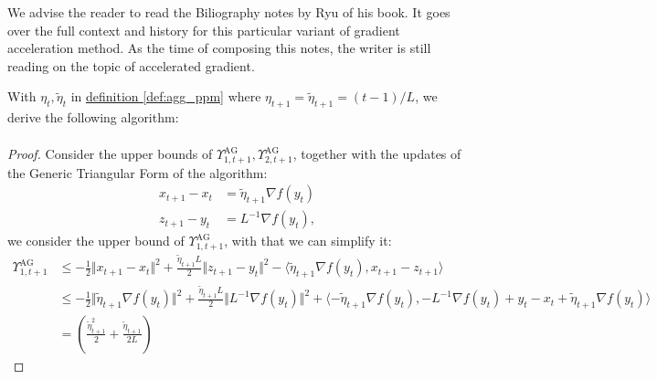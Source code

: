 \documentclass[12pt]{article}
\begin{document}
        We advise the reader to read the Biliography notes by Ryu \cite[chapter 12]{ryu_large-scale_2022} of his book. 
        It goes over the full context and history for this particular variant of gradient acceleration method. 
        As the time of composing this notes, the writer is still reading on the topic of accelerated gradient. 
        \begin{proposition}
            With $\eta_t, \tilde \eta_t$ in \hyperref[def:agg_ppm]{definition \ref*{def:agg_ppm}} where $\eta_{t + 1} = \tilde \eta_{t + 1} = (t - 1)/L$, we derive the following algorithm: 
            \begin{align*}
            \end{align*}

        \end{proposition}
        \begin{proof}
            Consider the upper bounds of $\Upsilon_{1, t + 1}^\text{AG}, \Upsilon_{2, t + 1}^\text{AG}$, together with the updates of the Generic Triangular Form of the algorithm:  
            \begin{align*}
                x_{t + 1} - x_t &= \tilde \eta_{t + 1}\nabla f(y_t)
                \\
                z_{t +1} - y_t &= L^{-1}\nabla f(y_t), 
            \end{align*}
            we consider the upper bound of $\Upsilon_{1, t + 1}^{\text{AG}}$, with that we can simplify it: 
            {\footnotesize
            \begin{align*}
                \Upsilon_{1, t + 1}^{\text{AG}}
                &\le 
                -\frac{1}{2}\Vert x_{t + 1} - x_t\Vert^2 
                + 
                \frac{\tilde \eta_{t + 1}L }{2} \Vert z_{t + 1} - y_t\Vert^2 
                - 
                \langle \tilde \eta_{t + 1} \nabla f(y_t), x_{t +1} - z_{t + 1}\rangle
                \\
                &\le 
                - \frac{1}{2}\Vert \tilde \eta_{t + 1} \nabla f(y_t)\Vert^2 
                + \frac{\tilde \eta_{t + 1} L}{2}\Vert L^{-1} \nabla f(y_t)\Vert^2 
                + 
                \langle 
                    - \tilde \eta_{t + 1} \nabla f(y_t), 
                    -L^{-1}\nabla f(y_t) + y_t - x_t + \tilde \eta_{t + 1}\nabla f(y_t)
                \rangle
                \\
                &= 
                \left(
                    \frac{\tilde \eta_{t + 1}^2}{2} + 
                    \frac{\tilde \eta_{t + 1}}{2L}
                \right)

\end{align*}}
\end{proof}
\end{document}
